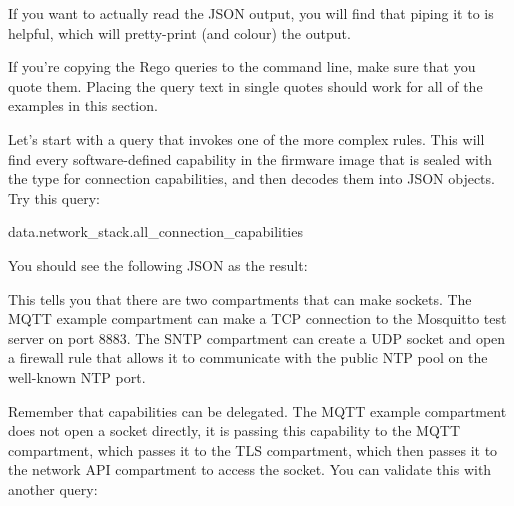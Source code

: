 {If you want to actually read the JSON output, you will find that piping it to  is helpful, which will pretty-print (and colour) the output.

\begin{note}
If you're copying the Rego queries to the command line, make sure that you quote them.
Placing the query text in single quotes should work for all of the examples in this section.
\end{note}

Let's start with a query that invokes one of the more complex rules.
This will find every software-defined capability in the firmware image that is sealed with the type for connection capabilities, and then decodes them into JSON objects.
Try this query:

\begin{regosnippet}
data.network_stack.all_connection_capabilities
\end{regosnippet}

You should see the following JSON as the result:

\begin{jsonsnippet}
[
  {
    "capability": {
      "connection_type": "UDP",
      "host": "pool.ntp.org",
      "port": 123
    \},
    "owner": "SNTP"
  \},
  {
    "capability": {
      "connection_type": "TCP",
      "host": "test.mosquitto.org",
      "port": 8883
    \},
    "owner": "mqtt_example"
  \}
]
\end{jsonsnippet}

This tells you that there are two compartments that can make sockets.
The MQTT example compartment can make a TCP connection to the Mosquitto test server on port 8883.
The SNTP compartment can create a UDP socket and open a firewall rule that allows it to communicate with the public NTP pool on the well-known NTP port.

Remember that capabilities can be delegated.
The MQTT example compartment does not open a socket directly, it is passing this capability to the MQTT compartment, which passes it to the TLS compartment, which then passes it to the network API compartment to access the socket.
You can validate this with another query:


}

